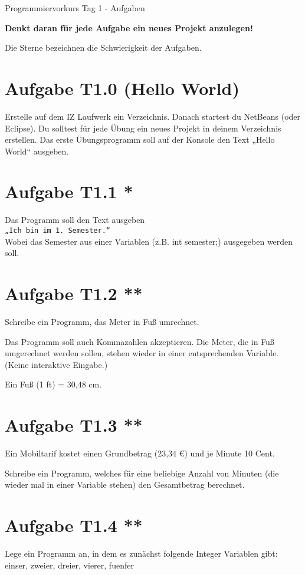 \documentclass[final,a4paper]{article}
\begin{document}
\lstset{tabsize=4}
\lstset{basicstyle=\small}
\lstset{language=java}

{\huge Programmiervorkurs Tag 1 - Aufgaben}

\bigskip

\textbf{\color{red}Denkt daran für jede Aufgabe ein neues Projekt anzulegen!}

Die Sterne bezeichnen die Schwierigkeit der Aufgaben.

\section*{Aufgabe T1.0 (Hello World)}
Erstelle auf dem IZ Laufwerk ein Verzeichnis.
Danach startest du NetBeans (oder Eclipse).
Du solltest für jede Übung ein neues Projekt in deinem Verzeichnis erstellen.
Das erste Übungsprogramm soll auf der Konsole den Text „Hello World“ ausgeben.

\section*{Aufgabe T1.1 *}
Das Programm soll den Text ausgeben\\
\texttt{„Ich bin im 1. Semester.“}\\
Wobei das Semester aus einer Variablen (z.B. int semester;) ausgegeben werden soll.

\section*{Aufgabe T1.2 **}
Schreibe ein Programm, das Meter in Fuß umrechnet. 

Das Programm soll auch Kommazahlen akzeptieren. 
Die Meter, die in Fuß umgerechnet werden sollen, stehen wieder in einer entsprechenden Variable. 
(Keine interaktive Eingabe.)

Ein Fuß (1 ft) = 30,48 cm.

\section*{Aufgabe T1.3 **}
Ein Mobiltarif kostet einen Grundbetrag (23,34 \euro) und je Minute 10 Cent. 

Schreibe ein Programm, welches für eine beliebige Anzahl von Minuten (die wieder mal in einer Variable stehen) den Gesamtbetrag berechnet.

\section*{Aufgabe T1.4 **}
Lege ein Programm an, in dem es zunächst folgende Integer Variablen gibt: einser, zweier, dreier, vierer, fuenfer
\end{document}
